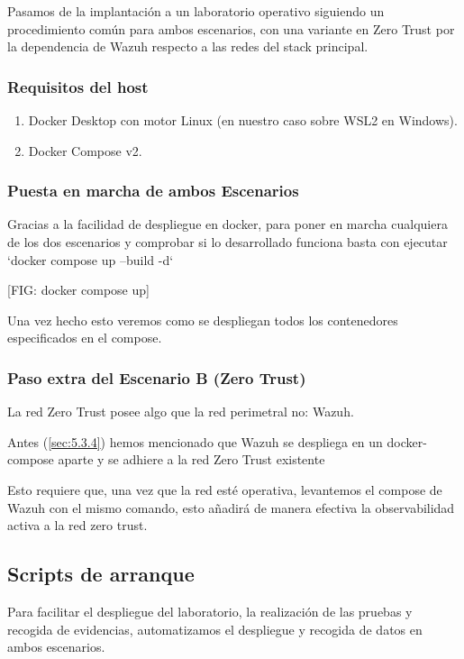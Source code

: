 \documentclass[11pt,spanish,listoffigures,listoftables]{tfgetsinf}
\begin{document}
    Pasamos de la implantación a un laboratorio operativo siguiendo un procedimiento común para ambos escenarios, con una variante en Zero Trust por la dependencia de Wazuh respecto a las redes del stack principal.
    
    \subsubsection{Requisitos del host}
    \begin{enumerate}
        \item Docker Desktop con motor Linux (en nuestro caso sobre WSL2 en Windows).
        \item Docker Compose v2.
    \end{enumerate}
    
    \subsubsection{Puesta en marcha de ambos Escenarios}
    Gracias a la facilidad de despliegue en docker, para poner en marcha cualquiera de los dos escenarios y comprobar si lo desarrollado funciona basta con ejecutar `docker compose up --build -d`

    [FIG: docker compose up]

    Una vez hecho esto veremos como se despliegan todos los contenedores especificados en el compose.    
    
    \subsubsection{Paso extra del Escenario B (Zero Trust)}
    La red Zero Trust posee algo que la red perimetral no: Wazuh.

    Antes (\cref{sec:5.3.4}) hemos mencionado que Wazuh se despliega en un docker-compose aparte y se adhiere a la red Zero Trust existente

    Esto requiere que, una vez que la red esté operativa, levantemos el compose de Wazuh con el mismo comando, esto añadirá de manera efectiva la observabilidad activa a la red zero trust.
    
    
    \subsection{Scripts de arranque}
    Para facilitar el despliegue del laboratorio, la realización de las pruebas y recogida de evidencias, automatizamos el despliegue y recogida de datos en ambos escenarios.
\end{document}
